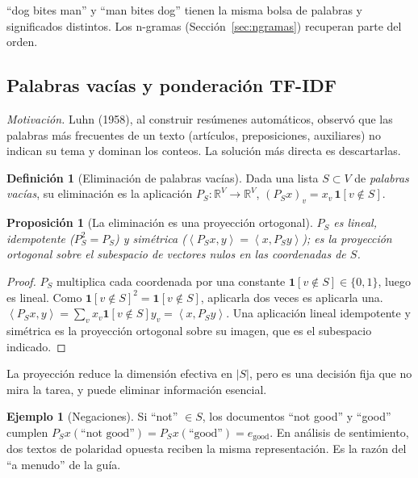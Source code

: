 \documentclass[11pt]{article}
\newtheorem{proposicion}[teorema]{Proposición}
\theoremstyle{definition}
\newtheorem{definicion}[teorema]{Definición}
\newtheorem{ejemplo}[teorema]{Ejemplo}
\theoremstyle{remark}
\newcommand{\R}{\mathbb{R}}
\newcommand{\ind}[1]{\mathbf{1}\!\left[#1\right]}
\newcommand{\abs}[1]{\left\lvert #1\right\rvert}
\newcommand{\ip}[2]{\left\langle #1,#2\right\rangle}
\begin{document}
\noindent ``dog bites man'' y ``man bites dog'' tienen la misma bolsa de palabras y significados distintos. Los n-gramas (Sección~\ref{sec:ngramas}) recuperan parte del orden.

\subsection{Palabras vacías y ponderación TF-IDF}\label{sec:stop}

\noindent \emph{Motivación.} Luhn (1958), al construir resúmenes automáticos, observó que las palabras más frecuentes de un texto (artículos, preposiciones, auxiliares) no indican su tema y dominan los conteos. La solución más directa es descartarlas.

\begin{definicion}[Eliminación de palabras vacías]\label{def:stop}
\noindent Dada una lista $S\subset V$ de \emph{palabras vacías}, su eliminación es la aplicación $P_S:\R^V\to\R^V$, $(P_Sx)_v=x_v\,\ind{v\notin S}$.
\end{definicion}

\begin{proposicion}[La eliminación es una proyección ortogonal]\label{prop:stop}
\noindent $P_S$ es lineal, idempotente ($P_S^2=P_S$) y simétrica ($\ip{P_Sx}{y}=\ip{x}{P_Sy}$); es la proyección ortogonal sobre el subespacio de vectores nulos en las coordenadas de $S$.
\end{proposicion}
\begin{proof}
\noindent $P_S$ multiplica cada coordenada por una constante $\ind{v\notin S}\in\{0,1\}$, luego es lineal. Como $\ind{v\notin S}^2=\ind{v\notin S}$, aplicarla dos veces es aplicarla una. $\ip{P_Sx}{y}=\sum_vx_v\ind{v\notin S}y_v=\ip x{P_Sy}$. Una aplicación lineal idempotente y simétrica es la proyección ortogonal sobre su imagen, que es el subespacio indicado.
\end{proof}

\noindent La proyección reduce la dimensión efectiva en $\abs S$, pero es una decisión fija que no mira la tarea, y puede eliminar información esencial.

\begin{ejemplo}[Negaciones]\label{ej:negacion}
\noindent Si ``not'' $\in S$, los documentos ``not good'' y ``good'' cumplen $P_Sx(\text{``not good''})=P_Sx(\text{``good''})=e_{\text{good}}$. En análisis de sentimiento, dos textos de polaridad opuesta reciben la misma representación. Es la razón del ``a menudo'' de la guía.
\end{ejemplo}
\end{document}
